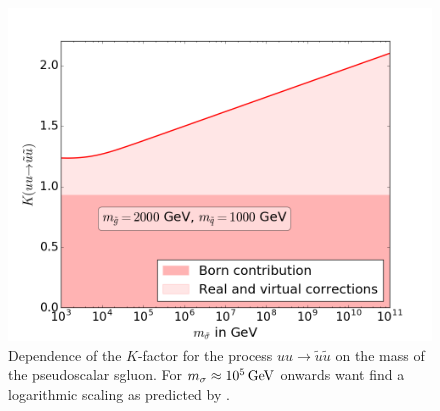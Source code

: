 \begin{figure}[!htpb]
\begin{center}
\includegraphics[scale=.5]{figures/MRSSM_uu_susu_Kfactors_msq=1000GeV_msg=2000GeV.png}
\caption{Dependence of the $K$-factor for the process $uu \to \tilde{u}\tilde{u}$ on the mass of the pseudoscalar sgluon. For $m_{\sigma} \approx \unit[10^5]{GeV}$ onwards want find a logarithmic scaling as predicted by \cite{Cheng:1997sq}.}
\end{center}
\end{figure}

